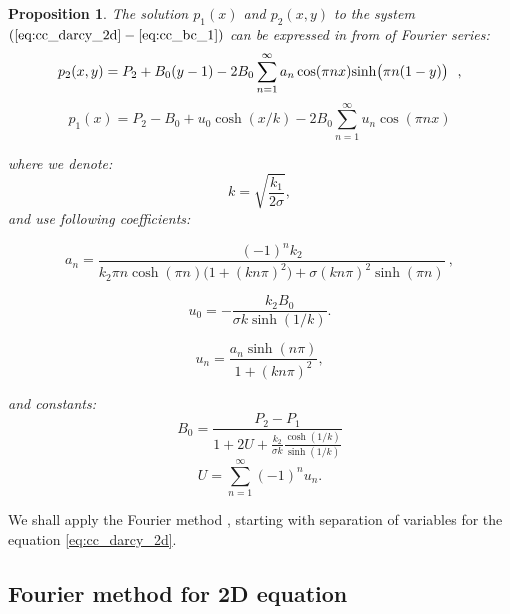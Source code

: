 \documentclass[a4paper,10pt]{article}
\newtheorem{prop}{Proposition}
\begin{document}
\begin{prop}
The solution $p_1(x)$ and $p_2(x,y)$ to the system $(\ref{eq:cc_darcy_2d} - \ref{eq:cc_bc_1})$
can be expressed in from of Fourier series:
\begin{equation}
    \label{eq:p2_series}
    p_2(x,y) = P_2 + B_0(y-1) -2B_0 \sum_{n=1}^\infty a_n \cos(\pi n x) {\rm sinh} \big(\pi n(1-y)\big)  \ \ ,
\end{equation}
%
\begin{equation}
    \label{eq:p2_series}
    p_1(x) = P_2-B_0 +u_0 \cosh(x/k) -2B_0 \sum_{n=1}^\infty  u_n \cos(\pi n x) 
\end{equation}

where we denote:
\[
    k = \sqrt{\frac{k_1}{2\sigma}}, 
\]    
and use following coefficients:

\begin{equation}
    \label{eq:an}
    a_n = \frac{(-1)^n k_2}{ k_2 \pi n \cosh(\pi n) \big(1 + (k n \pi)^2\big) 
    + \sigma (k n \pi)^2 \sinh(\pi n)} \ , 
\end{equation}

\begin{equation}
    \label{eq:u0}
    u_0 = -\frac{k_2 B_0}{\sigma k\sinh(1/k)}.
\end{equation}

\begin{equation}
    \label{eq:un}
    u_n = \frac{a_n \sinh(n \pi)}{1 + (k n \pi)^2}, 
\end{equation}




and constants:
\begin{equation}
     \label{eq:b0}
     B_0 = \frac{P_2 - P_1}{1 + 2  U + \frac{k_2}{\sigma k} \frac{\cosh(1/k)}{\sinh(1/k)}} 
\end{equation}
\begin{equation}
    \label{eq:U}
    U =  \sum_{n=1}^{\infty} (-1)^n u_n.
\end{equation}

\end{prop}

We shall apply the Fourier method \cite{??}, starting with separation of variables for the equation \eqref{eq:cc_darcy_2d}.  

\subsection{\bf Fourier method for 2D equation}
\label{sec:p2_conductive}
\end{document}

